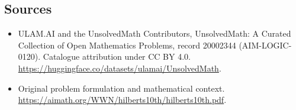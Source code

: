 \documentclass[11pt]{article}
\begin{document}
\subsection{Sources}
\begin{itemize}
\item[\hypertarget{source:20002344:1}{S1}] ULAM.AI and the UnsolvedMath Contributors, UnsolvedMath: A Curated Collection of Open Mathematics Problems, record 20002344 (AIM-LOGIC-0120). Catalogue attribution under CC BY 4.0.
\url{https://huggingface.co/datasets/ulamai/UnsolvedMath}.
\item[\hypertarget{source:20002344:2}{S2}] Original problem formulation and mathematical context.
\url{https://aimath.org/WWN/hilberts10th/hilberts10th.pdf}.
\end{itemize}
\label{end:20002344}
\end{document}
